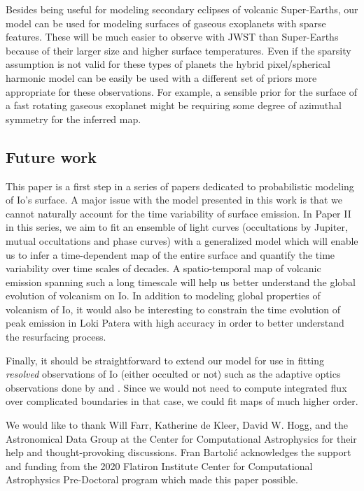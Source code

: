 \documentclass[modern]{aastex62}
\begin{document}
Besides being useful for modeling secondary eclipses of volcanic Super-Earths, our model can be used for modeling surfaces of gaseous exoplanets with sparse features.
These will be much easier to observe with JWST  than Super-Earths because of their larger size and higher surface temperatures.
Even if the sparsity assumption is not valid for these types of planets the hybrid pixel/spherical harmonic model can be easily be used with a different set of priors more appropriate for these observations.
For example, a sensible prior for the surface of a fast rotating gaseous exoplanet might be requiring some degree of azimuthal symmetry for the inferred map.

\subsection{Future work}
This paper is a first step in a series of papers dedicated to probabilistic modeling of Io's surface. 
A major issue with the model presented in this work is that we cannot naturally account for the time variability of surface emission.
In Paper II in this series, we aim to fit an ensemble of light curves (occultations by Jupiter, mutual occultations and phase curves) with a generalized model which will enable us to infer a time-dependent map of the entire surface and quantify the time variability over time scales of decades.
A spatio-temporal map of volcanic emission spanning such a long timescale will help us better understand the global evolution of volcanism on Io. 
In addition to modeling global properties of volcanism of Io, it would also be interesting to constrain the time evolution of peak emission in Loki Patera with high accuracy in order to better understand the resurfacing process.

Finally, it should be straightforward to extend our model for use in fitting \emph{resolved} observations of Io (either occulted or not) such as the adaptive optics observations done by \cite{dekleer2016a} and \cite{dekleer2016}.
Since we would not need to compute integrated flux over complicated boundaries in that case, we could fit maps of much higher order.

\vspace{+3em}

We would like to thank Will Farr, Katherine de Kleer, David W. Hogg, and the Astronomical Data Group at the Center for Computational Astrophysics for their help and thought-provoking discussions. Fran Bartoli\'c acknowledges the support and funding from the 2020 Flatiron Institute Center for Computational Astrophysics Pre-Doctoral program which made this paper possible.
\end{document}
